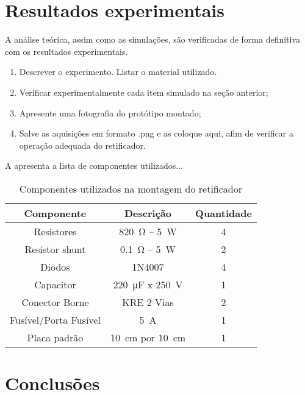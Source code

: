 \section{Resultados experimentais}


A análise teórica, assim como as simulações, são verificadas de forma definitiva com os resultados experimentais.
\begin{enumerate}									
	\item   Descrever o experimento. Listar o material utilizado.  
	\item  Verificar experimentalmente cada item simulado na seção anterior;
	\item  Apresente uma fotografia do protótipo montado;
	\item  Salve as aquisições em formato .png e as coloque aqui, afim de verificar a operação adequada do retificador.
\end{enumerate}

A  apresenta a lista de componentes utilizados...

\begin{table}[!ht]
	\centering
	\caption{Componentes utilizados na montagem do retificador}
	\label{tab:componentesRetificador}
	\begin{tabular}{@{}ccc@{}}
		\toprule
		\textbf{Componente} & \textbf{Descrição} & \textbf{Quantidade} \\ \midrule
		Resistores          & \SI{820}{\ohm} -- \SI{5}{\W}             & 4                   \\
		Resistor shunt      & \SI{0.1}{\ohm} -- \SI{5}{\W}             & 2                   \\
		Diodos              & 1N4007             & 4                   \\
		Capacitor           & \SI{220}{\micro\farad} x \SI{250}{\V}      & 1                   \\
		Conector Borne      &  KRE 2 Vias    & 2                   \\
		Fusível/Porta Fusível     &  \SI{5}{\A}  & 1                  \\
		Placa padrão        & \SI{10}{\cm} por \SI{10}{\cm}         & 1                   \\ \bottomrule
	\end{tabular}
\end{table}



\section{Conclusões} 

